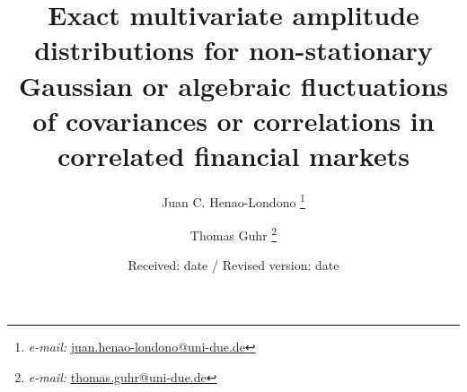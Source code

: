 \title{Exact multivariate amplitude distributions for non-stationary Gaussian
       or algebraic fluctuations of covariances or correlations in correlated
       financial markets}
\author{Juan C. Henao-Londono
        \thanks{\emph{e-mail: }\href{mailto:juan.henao-londono@uni-due.de}
        {juan.henao-londono@uni-due.de}}
        \and Thomas Guhr
        \thanks{\emph{e-mail: }\href{mailto:thomas.guhr@uni-due.de}
        {thomas.guhr@uni-due.de}}}
\date{Received: date / Revised version: date}
